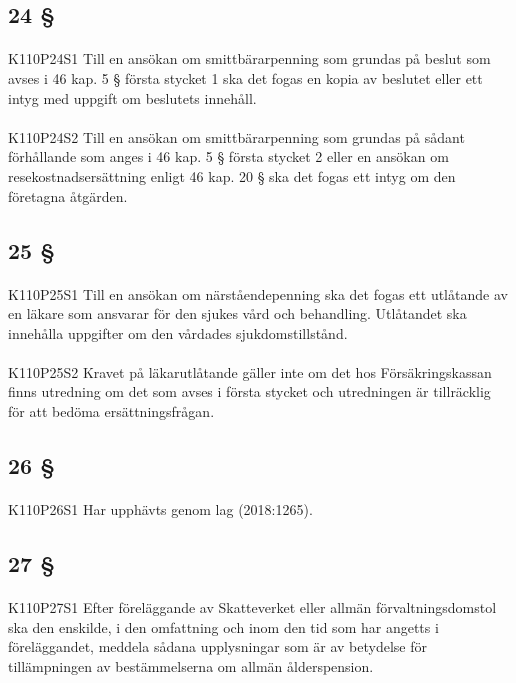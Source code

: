 \documentclass[a4paper,notitlepage,openany,10pt]{book}
\begin{document}
\subsection*{24 §}
\paragraph*{}
{\tiny K110P24S1}
Till en ansökan om smittbärarpenning som grundas på beslut som avses i 46 kap. 5 § första stycket 1 ska det fogas en kopia av beslutet eller ett intyg med uppgift om beslutets innehåll.
\paragraph*{}
{\tiny K110P24S2}
Till en ansökan om smittbärarpenning som grundas på sådant förhållande som anges i 46 kap. 5 § första stycket 2 eller en ansökan om resekostnadsersättning enligt 46 kap. 20 § ska det fogas ett intyg om den företagna åtgärden.
\subsection*{25 §}
\paragraph*{}
{\tiny K110P25S1}
Till en ansökan om närståendepenning ska det fogas ett utlåtande av en läkare som ansvarar för den sjukes vård och behandling. Utlåtandet ska innehålla uppgifter om den vårdades sjukdomstillstånd.
\paragraph*{}
{\tiny K110P25S2}
Kravet på läkarutlåtande gäller inte om det hos Försäkringskassan finns utredning om det som avses i första stycket och utredningen är tillräcklig för att bedöma ersättningsfrågan.
\subsection*{26 §}
\paragraph*{}
{\tiny K110P26S1}
Har upphävts genom
lag (2018:1265).
\subsection*{27 §}
\paragraph*{}
{\tiny K110P27S1}
Efter föreläggande av Skatteverket eller allmän förvaltningsdomstol ska den enskilde, i den omfattning och inom den tid som har angetts i föreläggandet, meddela sådana upplysningar som är av betydelse för tillämpningen av bestämmelserna om allmän ålderspension.
\end{document}
